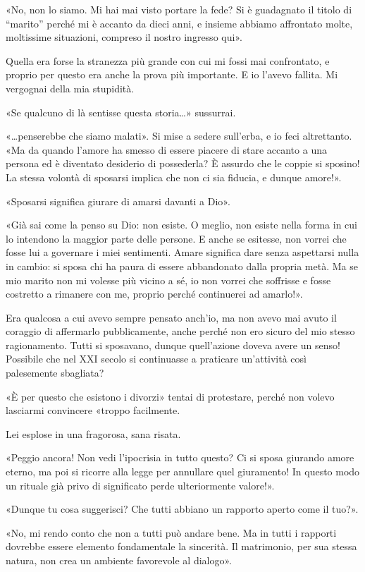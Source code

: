 «No, non lo siamo. Mi hai mai visto portare la fede? Si è guadagnato il titolo di ``marito'' perché
mi è accanto da dieci anni, e insieme abbiamo affrontato molte, moltissime situazioni, compreso il
nostro ingresso qui».

Quella era forse la stranezza più grande con cui mi fossi mai confrontato, e proprio per questo era
anche la prova più importante. E io l'avevo fallita. Mi vergognai della mia stupidità.

«Se qualcuno di là sentisse questa storia\dots{}» sussurrai.

«\dots{}penserebbe che siamo malati». Si mise a sedere sull'erba, e io feci altrettanto. «Ma da
quando l'amore ha smesso di essere piacere di stare accanto a una persona ed è diventato desiderio
di possederla? È assurdo che le coppie si sposino! La stessa volontà di sposarsi implica che non ci
sia fiducia, e dunque amore!».

«Sposarsi significa giurare di amarsi davanti a Dio».

«Già sai come la penso su Dio: non esiste. O meglio, non esiste nella forma in cui lo intendono la
maggior parte delle persone. E anche se esitesse, non vorrei che fosse lui a governare i miei
sentimenti. Amare significa dare senza aspettarsi nulla in cambio: si sposa chi ha paura di essere
abbandonato dalla propria metà. Ma se mio marito non mi volesse più vicino a sé, io non vorrei che
soffrisse e fosse costretto a rimanere con me, proprio perché continuerei ad amarlo!».

Era qualcosa a cui avevo sempre pensato anch'io, ma non avevo mai avuto il coraggio di affermarlo
pubblicamente, anche perché non ero sicuro del mio stesso ragionamento. Tutti si sposavano, dunque
quell'azione doveva avere un senso! Possibile che nel XXI secolo si continuasse a praticare
un'attività così palesemente sbagliata?

«È per questo che esistono i divorzi» tentai di protestare, perché non volevo lasciarmi convincere
«troppo facilmente.

Lei esplose in una fragorosa, sana risata.

«Peggio ancora! Non vedi l'ipocrisia in tutto questo? Ci si sposa giurando amore eterno, ma poi si
ricorre alla legge per annullare quel giuramento! In questo modo un rituale già privo di significato
perde ulteriormente valore!».

«Dunque tu cosa suggerisci? Che tutti abbiano un rapporto aperto come il tuo?».

«No, mi rendo conto che non a tutti può andare bene. Ma in tutti i rapporti dovrebbe essere elemento
fondamentale la sincerità. Il matrimonio, per sua stessa natura, non crea un ambiente favorevole al
dialogo».

